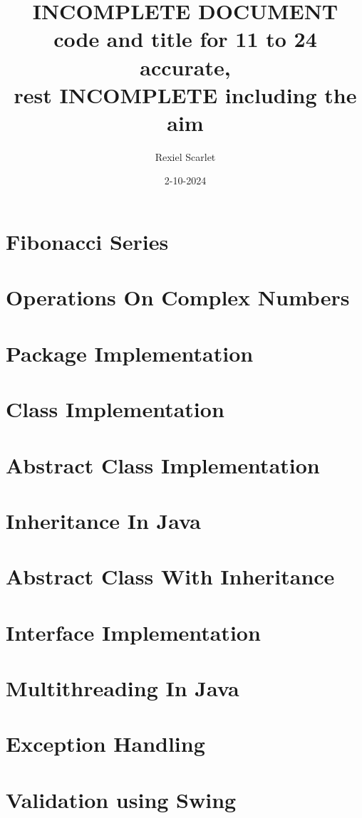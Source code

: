 \documentclass{article}
\title{%
  INCOMPLETE DOCUMENT \\
  \large code and title for 11 to 24 accurate, \\
  rest INCOMPLETE including the aim \\
}
\author{Rexiel Scarlet}
\date{2-10-2024}
\begin{document}
\maketitle
\newpage

\tableofcontents
\newpage

\section{Fibonacci Series}

\newpage

\section{Operations On Complex Numbers}

\newpage

\section{Package Implementation}
\section{Class Implementation}
\section{Abstract Class Implementation}
\section{Inheritance In Java}
\section{Abstract Class With Inheritance}
\section{Interface Implementation}
\section{Multithreading In Java}
\section{Exception Handling}
\newpage

\section{Validation using Swing}

\newpage
\end{document}
